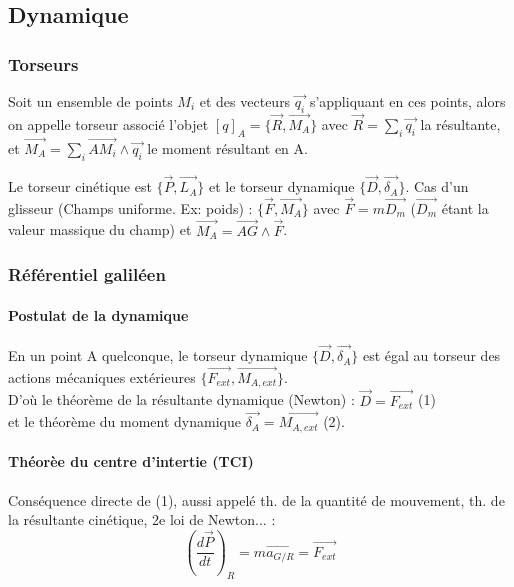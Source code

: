 \documentclass[9pt]{article}
\begin{document}
\begin{multicols*}{2}
\setlength{\columnseprule}{0.1pt}
\part*{Dynamique}
\section{Torseurs}
Soit un ensemble de points $M_i$ et des vecteurs $\overrightarrow{q_i}$ s'appliquant en ces points, alors on appelle torseur associé l'objet $[q]_A=\{\overrightarrow{R},\overrightarrow{M_A}\}$ avec $\overrightarrow{R}=\sum_i\overrightarrow{q_i}$ la résultante, et $\overrightarrow{M_A}=\sum_i\overrightarrow{AM_i}\wedge\overrightarrow{q_i}$ le moment résultant en A.

Le torseur cinétique est $\{\overrightarrow{P}, \overrightarrow{L_A}\}$ et le torseur dynamique $\{\overrightarrow{D},\overrightarrow{\delta_A}\}$.
Cas d'un glisseur (Champs uniforme. Ex: poids) : $\{\overrightarrow{F}, \overrightarrow{M_A}\}$ avec $\overrightarrow{F} = m\overrightarrow{D_m}$ ($\overrightarrow{D_m}$ étant la valeur massique du champ) et $\overrightarrow{M_A}=\overrightarrow{AG}\wedge\overrightarrow{F}$.
\section{Référentiel galiléen}
\subsection{Postulat de la dynamique}
En un point A quelconque, le torseur dynamique $\{\overrightarrow{D}, \overrightarrow{\delta_A}\}$ est égal au torseur des actions mécaniques extérieures $\{\overrightarrow{F_{ext}}, \overrightarrow{M_{A,ext}}\}$.\\
D'où le théorème de la résultante dynamique (Newton) : $\overrightarrow{D} = \overrightarrow{F_{ext}}$ (1) \\
et le théorème du moment dynamique $\overrightarrow{\delta_A}=\overrightarrow{M_{A,ext}}$ (2).

\subsection{Théorèe du centre d'intertie (TCI)}
Conséquence directe de (1), aussi appelé th. de la quantité de mouvement, th. de la résultante cinétique, 2e loi de Newton...  :
$$\boxed{\left( \frac{d\overrightarrow{P}}{dt} \right)_R = m\overrightarrow{a_{G/R}} = \overrightarrow{F_{ext}}}$$

\end{multicols*}
\end{document}
